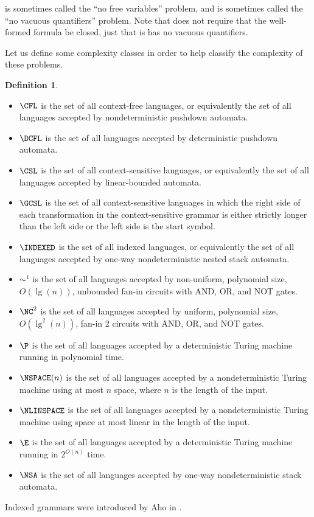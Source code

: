 \documentclass[draft]{article}
\theoremstyle{remark} \newtheorem{technicality}{Technical note}
\theoremstyle{definition} \newtheorem{definition}{Definition}
\begin{document}
 is sometimes called the ``no free variables'' problem, and  is sometimes called the ``no vacuous quantifiers'' problem.
Note that  does not require that the well-formed formula be closed, just that is has no vacuous quantifiers.

Let us define some complexity classes in order to help classify the complexity of these problems.
\begin{definition}\mbox{}
  \begin{itemize}
  \item $\CFL$ is the set of all context-free languages, or equivalently the set of all languages accepted by nondeterministic pushdown automata.
  \item $\DCFL$ is the set of all languages accepted by deterministic pushdown automata.
  \item $\CSL$ is the set of all context-sensitive languages, or equivalently the set of all languages accepted by linear-bounded automata.
  \item $\GCSL$ is the set of all context-sensitive languages in which the right side of each transformation in the context-sensitive grammar is either strictly longer than the left side or the left side is the start symbol.
  \item $\INDEXED$ is the set of all indexed languages, or equivalently the set of all languages accepted by one-way nondeterministic nested stack automata.
  \item $\AC^1$ is the set of all languages accepted by non-uniform, polynomial size, $O(\lg(n))$, unbounded fan-in circuits with AND, OR, and NOT gates.
  \item $\NC^2$ is the set of all languages accepted by uniform, polynomial size, $O(\lg^2(n))$, fan-in 2 circuits with AND, OR, and NOT gates.
  \item $\P$ is the set of all languages accepted by a deterministic Turing machine running in polynomial time.
  \item $\NSPACE(n)$ is the set of all languages accepted by a nondeterministic Turing machine using at most $n$ space, where $n$ is the length of the input.
  \item $\NLINSPACE$ is the set of all languages accepted by a nondeterministic Turing machine using space at most linear in the length of the input.
  \item $\E$ is the set of all languages accepted by a deterministic Turing machine running in $2^{O(n)}$ time.
  \item $\NSA$ is the set of all languages accepted by one-way nondeterministic stack automata.
  \end{itemize}
\end{definition}
Indexed grammars were introduced by Aho in \cite{aho}.
\end{document}
